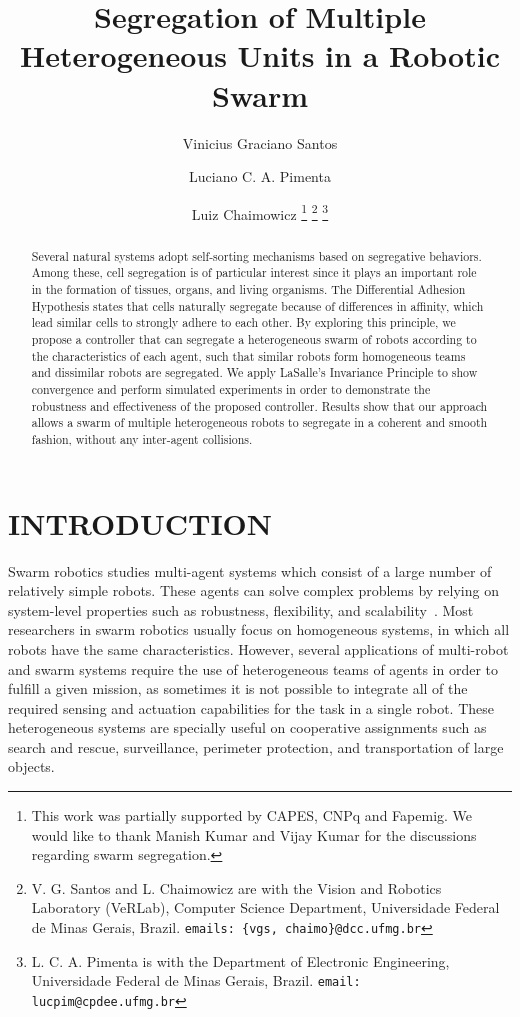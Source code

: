 \documentclass[letterpaper, 10 pt, conference]{ieeeconf}  %
\title{\LARGE \bf
Segregation of Multiple Heterogeneous Units in a Robotic Swarm
}
\author{Vinicius Graciano Santos \and Luciano C. A. Pimenta \and Luiz
  Chaimowicz%
  \thanks{This work was partially supported by CAPES, CNPq and Fapemig. We
    would like to thank Manish Kumar and Vijay Kumar for the
    discussions regarding swarm segregation.}%
  \thanks{V. G. Santos and L. Chaimowicz are with the Vision and
    Robotics Laboratory (VeRLab), Computer Science Department,
    Universidade Federal de Minas Gerais, Brazil. {\tt\small emails:
      \{vgs, chaimo\}@dcc.ufmg.br}} \thanks{L. C. A. Pimenta is with
    the Department of Electronic Engineering, Universidade Federal de
    Minas Gerais, Brazil. {\tt\small email: lucpim@cpdee.ufmg.br}}%
}
\begin{document}
\maketitle
\thispagestyle{empty}
\pagestyle{empty}


\begin{abstract}
  Several natural systems adopt self-sorting mechanisms based on
  segregative behaviors. Among these, cell segregation is of
  particular interest since it plays an important role in the
  formation of tissues, organs, and living organisms. The Differential
  Adhesion Hypothesis states that cells naturally segregate because of
  differences in affinity, which lead similar cells to strongly adhere
  to each other. By exploring this principle, we propose a controller
  that can segregate a heterogeneous swarm of robots according to the
  characteristics of each agent, such that similar robots form
  homogeneous teams and dissimilar robots are segregated. We apply
  LaSalle's Invariance Principle to show convergence and perform
  simulated experiments in order to demonstrate the robustness and
  effectiveness of the proposed controller. Results show that our
  approach allows a swarm of multiple heterogeneous robots to
  segregate in a coherent and smooth fashion, without any inter-agent
  collisions.
\end{abstract}

\section{INTRODUCTION}
Swarm robotics studies multi-agent systems which consist of a large
number of relatively simple robots. These agents can solve complex
problems by relying on system-level properties such as robustness,
flexibility, and scalability~\cite{Sahin:04}. Most researchers in
swarm robotics usually focus on homogeneous systems, in which all
robots have the same characteristics. However, several applications of
multi-robot and swarm systems require the use of heterogeneous teams
of agents in order to fulfill a given mission, as sometimes it is not
possible to integrate all of the required sensing and actuation
capabilities for the task in a single robot. These heterogeneous
systems are specially useful on cooperative assignments such as search
and rescue, surveillance, perimeter protection, and transportation of
large objects.
\end{document}
